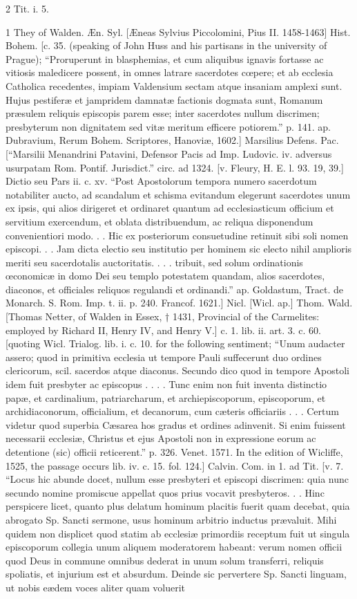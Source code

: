 2
Tit. i. 5.

1
They of Walden. Æn. Syl. [Æneas Sylvius Piccolomini, Pius II. 1458-1463] Hist. Bohem. [c. 35. (speaking of John Huss and his partisans in the university of Prague); “Proruperunt in blasphemias, et cum aliquibus ignavis fortasse ac vitiosis maledicere possent, in omnes latrare sacerdotes cœpere; et ab ecclesia Catholica recedentes, impiam Valdensium sectam atque insaniam amplexi sunt. Hujus pestiferæ et jampridem damnatæ factionis dogmata sunt, Romanum præsulem reliquis episcopis parem esse; inter sacerdotes nullum discrimen; presbyterum non dignitatem sed vitæ meritum efficere potiorem.” p. 141. ap. Dubravium, Rerum Bohem. Scriptores, Hanoviæ, 1602.] Marsilius Defens. Pac. [“Marsilii Menandrini Patavini, Defensor Pacis ad Imp. Ludovic. iv. adversus usurpatam Rom. Pontif. Jurisdict.” circ. ad 1324. [v. Fleury, H. E. l. 93. 19, 39.] Dictio seu Pars ii. c. xv. “Post Apostolorum tempora numero sacerdotum notabiliter aucto, ad scandalum et schisma evitandum elegerunt sacerdotes unum ex ipsis, qui alios dirigeret et ordinaret quantum ad ecclesiasticum officium et servitium exercendum, et oblata distribuendum, ac reliqua disponendum convenientiori modo. . . Hic ex posteriorum consuetudine retinuit sibi soli nomen episcopi. . . Jam dicta electio seu institutio per hominem sic electo nihil amplioris meriti seu sacerdotalis auctoritatis. . . . tribuit, sed solum ordinationis œconomicæ in domo Dei seu templo potestatem quandam, alios sacerdotes, diaconos, et officiales reliquos regulandi et ordinandi.” ap. Goldastum, Tract. de Monarch. S. Rom. Imp. t. ii. p. 240. Francof. 1621.] Nicl. [Wicl. ap.] Thom. Wald. [Thomas Netter, of Walden in Essex, † 1431, Provincial of the Carmelites: employed by Richard II, Henry IV, and Henry V.] c. 1. lib. ii. art. 3. c. 60. [quoting Wicl. Trialog. lib. i. c. 10. for the following sentiment; “Unum audacter assero; quod in primitiva ecclesia ut tempore Pauli suffecerunt duo ordines clericorum, scil. sacerdos atque diaconus. Secundo dico quod in tempore Apostoli idem fuit presbyter ac episcopus . . . . Tunc enim non fuit inventa distinctio papæ, et cardinalium, patriarcharum, et archiepiscoporum, episcoporum, et archidiaconorum, officialium, et decanorum, cum cæteris officiariis . . . Certum videtur quod superbia Cæsarea hos gradus et ordines adinvenit. Si enim fuissent necessarii ecclesiæ, Christus et ejus Apostoli non in expressione eorum ac detentione (sic) officii reticerent.” p. 326. Venet. 1571. In the edition of Wicliffe, 1525, the passage occurs lib. iv. c. 15. fol. 124.] Calvin. Com. in 1. ad Tit. [v. 7. “Locus hic abunde docet, nullum esse presbyteri et episcopi discrimen: quia nunc secundo nomine promiscue appellat quos prius vocavit presbyteros. . . Hinc perspicere licet, quanto plus delatum hominum placitis fuerit quam decebat, quia abrogato Sp. Sancti sermone, usus hominum arbitrio inductus prævaluit. Mihi quidem non displicet quod statim ab ecclesiæ primordiis receptum fuit ut singula episcoporum collegia unum aliquem moderatorem habeant: verum nomen officii quod Deus in commune omnibus dederat in unum solum transferri, reliquis spoliatis, et injurium est et absurdum. Deinde sic pervertere Sp. Sancti linguam, ut nobis eædem voces aliter quam voluerit 